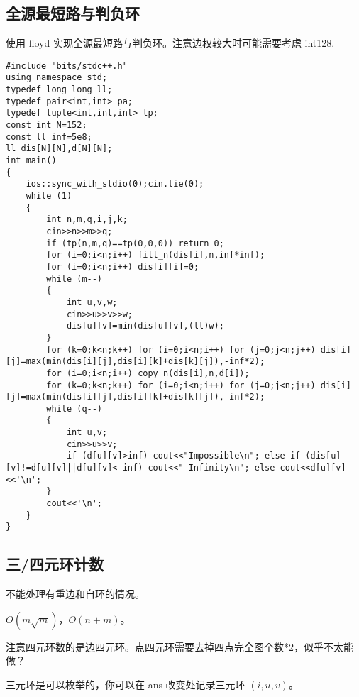\documentclass[12pt]{ctexart}
\begin{document}
\subsection{全源最短路与判负环}

使用 floyd 实现全源最短路与判负环。注意边权较大时可能需要考虑 int128.

\begin{lstlisting}
#include "bits/stdc++.h"
using namespace std;
typedef long long ll;
typedef pair<int,int> pa;
typedef tuple<int,int,int> tp;
const int N=152;
const ll inf=5e8;
ll dis[N][N],d[N][N];
int main()
{
	ios::sync_with_stdio(0);cin.tie(0);
	while (1)
	{
		int n,m,q,i,j,k;
		cin>>n>>m>>q;
		if (tp(n,m,q)==tp(0,0,0)) return 0;
		for (i=0;i<n;i++) fill_n(dis[i],n,inf*inf);
		for (i=0;i<n;i++) dis[i][i]=0;
		while (m--)
		{
			int u,v,w;
			cin>>u>>v>>w;
			dis[u][v]=min(dis[u][v],(ll)w);
		}
		for (k=0;k<n;k++) for (i=0;i<n;i++) for (j=0;j<n;j++) dis[i][j]=max(min(dis[i][j],dis[i][k]+dis[k][j]),-inf*2);
		for (i=0;i<n;i++) copy_n(dis[i],n,d[i]);
		for (k=0;k<n;k++) for (i=0;i<n;i++) for (j=0;j<n;j++) dis[i][j]=max(min(dis[i][j],dis[i][k]+dis[k][j]),-inf*2);
		while (q--)
		{
			int u,v;
			cin>>u>>v;
			if (d[u][v]>inf) cout<<"Impossible\n"; else if (dis[u][v]!=d[u][v]||d[u][v]<-inf) cout<<"-Infinity\n"; else cout<<d[u][v]<<'\n';
		}
		cout<<'\n';
	}
}
\end{lstlisting}

\subsection{三/四元环计数}

不能处理有重边和自环的情况。

$O(m\sqrt m)$，$O(n+m)$。

注意四元环数的是边四元环。点四元环需要去掉四点完全图个数*2，似乎不太能做？

三元环是可以枚举的，你可以在 ans 改变处记录三元环 $(i,u,v)$。
\end{document}
